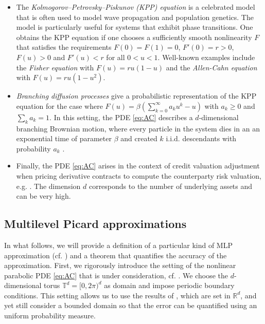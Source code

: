 \documentclass{article}
\numberwithin{equation}{section}
\newcommand{\T}{\mathbb{T}}
\newcommand{\R}{\mathbb{R}}
\newcommand{\1}{\mathbbm{1}}
\begin{document}
\begin{itemize}
    \item The \textit{Kolmogorov–Petrovsky–Piskunov (KPP) equation} \cite{kolmogorov1937etude} is a celebrated model that is often used to model wave propagation and population genetics. The model is particularly useful for systems that exhibit phase transitions. One obtains the KPP equation if one chooses a sufficiently smooth nonlinearity $F$ that satisfies the requirements $F(0)=F(1)=0$, $F'(0)=r>0$, $F(u)>0$ and $F'(u)<r$ for all $0<u<1$. Well-known examples include the \textit{Fisher equation} \cite{fisher1937wave} with $F(u)=ru(1-u)$ and the \textit{Allen-Cahn equation} \cite{allen1979microscopic} with $F(u)=ru(1-u^2)$.
    \item \textit{Branching diffusion processes } give a probabilistic representation of the KPP equation for the case where $F(u) = \beta(\sum_{k=0}^\infty a_k u^k-u)$ with $a_k\geq 0$ and $\sum_k a_k = 1$. In this setting, the PDE \eqref{eq:AC} describes a $d$-dimensional branching Brownian motion, where every particle in the system dies in an an exponential time of parameter $\beta$ and created $k$ i.i.d. descendants with probability $a_k$ \cite{henry2014numerical, mckean1975application}. 
    \item Finally, the PDE \eqref{eq:AC} arises in the context of credit valuation adjustment when pricing derivative contracts to compute the counterparty risk valuation, e.g. \cite{henry2012counterparty}. The dimension $d$ corresponds to the number of underlying assets and can be very high. 
\end{itemize}

\subsection{Multilevel Picard approximations}

In what follows, we will provide a definition of a particular kind of MLP approximation (cf. \cite{aj2021mlp}) and a theorem that quantifies the accuracy of the approximation. First, we rigorously introduce the setting of the nonlinear parabolic PDE \eqref{eq:AC} that is under consideration, cf. \cite[Setting 3.2 with $p\leftarrow0$]{aj2021mlp}. We choose the $d$-dimensional torus $\T^d=[0,2\pi)^d$ as domain and impose periodic boundary conditions. This setting allows us to use the results of \cite{aj2021mlp}, which are set in $\R^d$, and yet still consider a bounded domain so that the error can be quantified using an uniform probability measure. 
\end{document}
